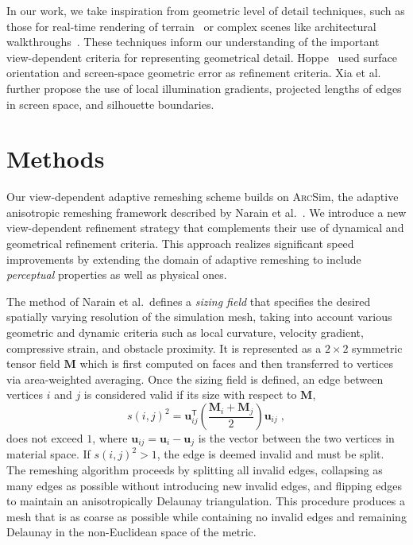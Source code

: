\documentclass[10pt,journal,compsoc,twoside]{TexInputs/IEEEtran}
\newcommand{\arcsim}{\textsc{Arc}Sim\xspace}
\begin{document}
In our work, we take inspiration from geometric level of detail techniques, such as those for real-time rendering of terrain~\cite{Duchaineau:1997:RTR,Hoppe:1998:SVL} or complex scenes like architectural walkthroughs~\cite{Funkhouser:1993:ADA}.
These techniques inform our understanding of the important view-dependent criteria for representing geometrical detail.
Hoppe~\cite{Hoppe:1997:VRP} used surface orientation and screen-space geometric
error as refinement criteria.
Xia et al.~\cite{Xia:1997:ARL} further propose the use of local illumination gradients, projected lengths of edges in screen space, and silhouette boundaries.


\section{Methods}

Our view-dependent adaptive remeshing scheme builds on \arcsim, the adaptive anisotropic
remeshing framework described by Narain et al.~\cite{Narain:2012:AAR}. We introduce a new
view-dependent refinement strategy that complements their use of dynamical and
geometrical refinement criteria. This approach realizes significant speed
improvements by extending the domain of adaptive remeshing to include
\textit{perceptual} properties as well as physical ones.

The method of Narain et al.~defines a \emph{sizing field} that specifies
the desired spatially varying resolution of the simulation mesh, taking into account various geometric and dynamic criteria such as local
curvature, velocity gradient, compressive strain, and obstacle proximity. It is
represented as a $2 \times 2$ symmetric tensor field $\mathbf{M}$ which is first computed on faces and then transferred to vertices via area-weighted averaging.
Once the sizing field is defined, an edge between
vertices $i$ and $j$ is considered valid if its size with respect to $\mathbf
M$,
\begin{equation} \label{eq:invalid}
    s(i, j)^2 = \mathbf{u}^{\mathsf T}_{ij} \left( \frac{\mathbf{M}_i + \mathbf{M}_j}{2} \right) \mathbf{u}_{ij} \; ,
\end{equation}
does not exceed $1$, where $\mathbf{u}_{ij} = \mathbf u_i - \mathbf u_j$ is the
vector between the two vertices in material space. If $s(i,j)^2 > 1$, the edge
is deemed invalid and must be split.
The remeshing algorithm proceeds by splitting all invalid edges, collapsing as many edges as possible without introducing new invalid edges, and flipping edges to maintain an anisotropically Delaunay triangulation.
This procedure produces a mesh that is as coarse as possible while containing no invalid edges and remaining Delaunay in the 
non-Euclidean  
space of the metric.
\end{document}
